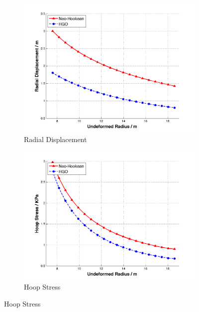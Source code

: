 \begin{figure}[t!p]
	\begin{subfigure}[b]{0.5\textwidth}
		\centering
		\includegraphics[width=\textwidth]{./figures/ur_nh_hgo.png}
		\caption{Radial Displacement}
		\label{ur_nh_hgo}
	\end{subfigure}
	\begin{subfigure}[b]{0.5\textwidth}
		\centering
		\includegraphics[width=\textwidth]{./figures/hoop_nh_hgo.png}
		\caption{Hoop Stress}
		\label{hoop_nh_hgo}
	\end{subfigure}
	

\end{figure}
